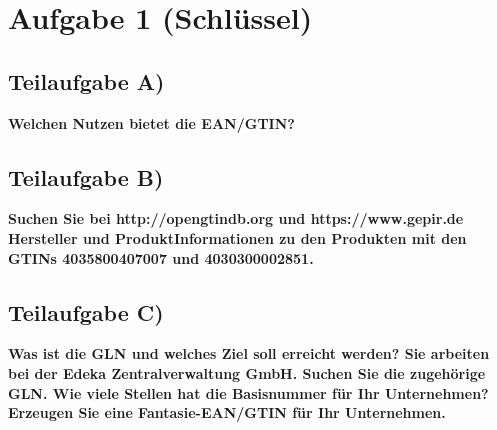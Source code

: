 \section{Aufgabe 1 (Schlüssel)}

\subsection{Teilaufgabe A)}
\textbf{Welchen Nutzen bietet die EAN/GTIN?}

\subsection{Teilaufgabe B)}
\textbf{Suchen Sie bei http://opengtindb.org und https://www.gepir.de Hersteller und ProduktInformationen
zu den Produkten mit den GTINs 4035800407007 und 4030300002851.}


\subsection{Teilaufgabe C)}
\textbf{Was ist die GLN und welches Ziel soll erreicht werden? Sie arbeiten bei der Edeka
Zentralverwaltung GmbH. Suchen Sie die zugehörige GLN. Wie viele Stellen hat die
Basisnummer für Ihr Unternehmen? Erzeugen Sie eine Fantasie-EAN/GTIN für Ihr
Unternehmen.}

\clearpage 